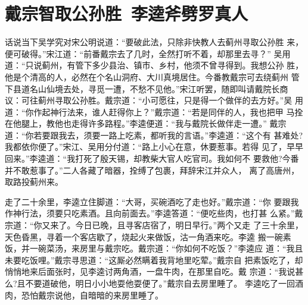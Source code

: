 \chapter{戴宗智取公孙胜~李逵斧劈罗真人}

话说当下吴学究对宋公明说道：“要破此法，只除非快教人去蓟州寻取公孙胜
来，便可破得。”宋江道：“前番戴宗去了几时，全然打听不着，却那里去寻？”
吴用道：“只说蓟州，有管下多少县治、镇市、乡村，他须不曾寻得到。我想公孙
胜，他是个清高的人，必然在个名山洞府、大川真境居住。今番教戴宗可去绕蓟州
管下县道名山仙境去处，寻觅一遭，不愁不见他。”宋江听罢，随即叫请戴院长商
议：可往蓟州寻取公孙胜。戴宗道：“小可愿往，只是得一个做伴的去方好。”吴
用道：“你作起神行法来，谁人赶得你上？”戴宗道：“若是同伴的人，我也把甲
马拴在他腿上，教他也走得许多路程。”李逵便道：“我与戴院长做伴走一遭。”
戴宗道：“你若要跟我去，须要一路上吃素，都听我的言语。”李逵道：“这个有
甚难处?我都依你便了。”宋江、吴用分付道：“路上小心在意，休要惹事。若得
见了，早早回来。”李逵道：“我打死了殷天锡，却教柴大官人吃官司。我如何不
要救他?今番并不敢惹事了。”二人各藏了暗器，拴缚了包裹，拜辞宋江并众人，
离了高唐州，取路投蓟州来。

走了二十余里，李逵立住脚道：“大哥，买碗酒吃了走也好。”戴宗道：“你
要跟我作神行法，须要只吃素酒。且向前面去。”李逵答道：“便吃些肉，也打甚
么紧。”戴宗道：“你又来了。今日已晚，且寻客店宿了，明日早行。”两个又走
了三十余里，天色昏黑，寻着一个客店歇了，烧起火来做饭，沽一角酒来吃。李逵
搬一碗素饭，并一碗菜汤，来房里与戴宗吃。戴宗道：“你如何不吃饭？”李逵应
道：“我且未要吃饭哩。”戴宗寻思道：“这厮必然瞒着我背地里吃荤。”戴宗自
把素饭吃了，却悄悄地来后面张时，见李逵讨两角酒，一盘牛肉，在那里自吃。戴
宗道：“我说甚么?且不要道破他，明日小小地耍他耍便了。”戴宗自去房里睡了。
李逵吃了一回酒肉，恐怕戴宗说他，自暗暗的来房里睡了。

